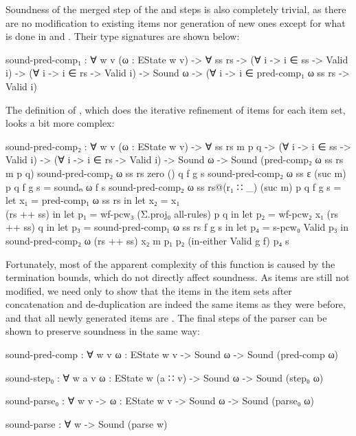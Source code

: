 		Soundness of the merged step  of the 
		and  steps is also completely trivial, as there are no
		modification to existing items nor generation of new ones except for
		what is done in  and . Their type
		signatures are shown below:

		\begin{code}
			sound-pred-comp₁ : ∀ {w v} (ω : EState w v) -> ∀ ss rs ->
			  (∀ {i} -> i ∈ ss -> Valid i) ->
			  (∀ {i} -> i ∈ rs -> Valid i) ->
			  Sound ω -> (∀ {i} -> i ∈ pred-comp₁ ω ss rs -> Valid i)
		\end{code}

		The definition of , which does the iterative
		refinement of items for each item set, looks a bit more complex:

		\begin{code}
			sound-pred-comp₂ : ∀ {w v} (ω : EState w v) -> ∀ ss rs m p q ->
			  (∀ {i} -> i ∈ ss -> Valid i) ->
			  (∀ {i} -> i ∈ rs -> Valid i) ->
			  Sound ω -> Sound (pred-comp₂ ω ss rs m p q)
			sound-pred-comp₂ ω ss rs zero () q f g s
			sound-pred-comp₂ ω ss ε (suc m) p q f g s = soundₙ ω f s
			sound-pred-comp₂ ω ss rs@(r₁ ∷ _) (suc m) p q f g s =
			  let x₁ = pred-comp₁ ω ss rs in
			  let x₂ = x₁ \\ (rs ++ ss) in
			  let p₁ = wf-pcw₃ (Σ.proj₀ all-rules) p q  in
			  let p₂ = wf-pcw₂ x₁ (rs ++ ss) q in
			  let p₃ = sound-pred-comp₁ ω ss rs f g s in
			  let p₄ = s-pcw₀ Valid p₃ in
			  sound-pred-comp₂ ω (rs ++ ss) x₂ m p₁ p₂ (in-either Valid g f) p₄ s
		\end{code}

		Fortunately, most of the apparent complexity of this function is caused
		by the termination bounds, which do not directly affect soundness. As
		items are still not modified, we need only to show that the items in
		the item sets after concatenation and de-duplication are indeed the
		same items as they were before, and that all newly generated items are
		. The final steps of the parser can be shown to preserve
		soundness in the same way:

		\begin{code}
			sound-pred-comp : ∀ {w v} {ω : EState w v} ->
			  Sound ω -> Sound (pred-comp ω)

			sound-step₀ : ∀ {w a v} {ω : EState w (a ∷ v)} ->
			  Sound ω -> Sound (step₀ ω)

			sound-parse₀ : ∀ {w v} -> {ω : EState w v} ->
			  Sound ω -> Sound (parse₀ ω)

			sound-parse : ∀ w -> Sound (parse w)
		\end{code}

